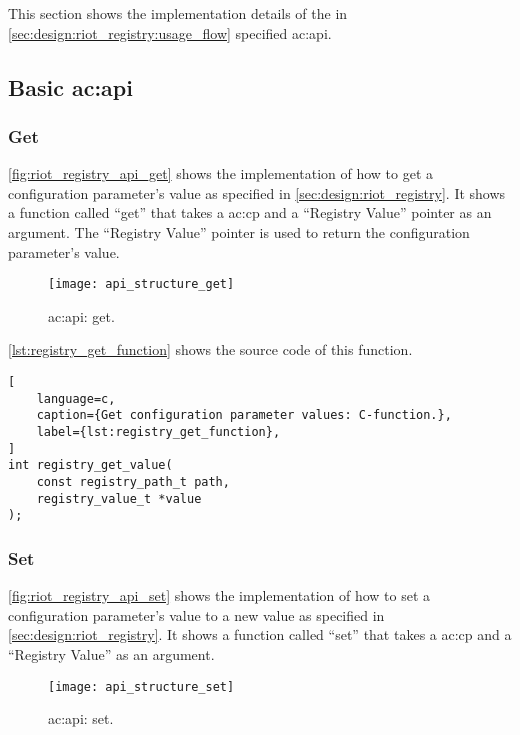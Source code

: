 {This section shows the implementation details of the in \autoref{sec:design:riot_registry:usage_flow} specified \gls{ac:api}.

\subsection{Basic \gls*{ac:api}}

\subsubsection{Get}

\autoref{fig:riot_registry_api_get} shows the implementation of how to get a configuration parameter's value as specified in \autoref{sec:design:riot_registry}.
It shows a function called ``get'' that takes a \gls{ac:cp} and a ``Registry Value'' pointer as an argument.
The ``Registry Value'' pointer is used to return the configuration parameter's value.

\begin{figure}[H]
    \centering
    \texttt{[image: api\_structure\_get]}
    \caption{ \gls{ac:api}: get.}
    \label{fig:riot_registry_api_get}
\end{figure}

\autoref{lst:registry_get_function} shows the source code of this function.

\begin{lstlisting}[
    language=c,
    caption={Get configuration parameter values: C-function.},
    label={lst:registry_get_function},
]
int registry_get_value(
    const registry_path_t path,
    registry_value_t *value
);
\end{lstlisting}

\subsubsection{Set}

\autoref{fig:riot_registry_api_set} shows the implementation of how to set a configuration parameter's value to a new value as specified in \autoref{sec:design:riot_registry}.
It shows a function called ``set'' that takes a \gls{ac:cp} and a ``Registry Value'' as an argument.

\begin{figure}[H]
    \centering
    \texttt{[image: api\_structure\_set]}
    \caption{ \gls{ac:api}: set.}
    \label{fig:riot_registry_api_set}
\end{figure}

}
